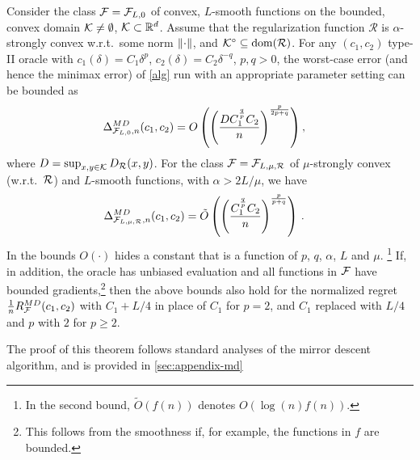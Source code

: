 \begin{theorem}
\label{thm:ub}
Consider the class $\mathcal{F}=\mathcal{F}_{L,0}$ of convex, $L$-smooth functions on the bounded, convex domain $\mathcal{K}\ne \emptyset$, $\mathcal{K} \subset \mathbb{R}^d$.
Assume that the regularization function $\mathcal{R}$ is $\alpha$-strongly convex w.r.t.\  some norm $\left\|\cdot\right\|$, and $\mathcal{K}^\circ\subseteq \operatorname{dom}(\mathcal{R})$.
For any $(c_1,c_2)$ type-II oracle 
with $c_1(\delta) = C_1 \delta^p$, $c_2(\delta) = C_2 \delta^{-q}$, $p,q>0$, 
the worst-case error (and hence the minimax error) of \cref{alg} run with an appropriate parameter setting
can be bounded as
 \begin{align}
 \label{eq:MDbound1}
 \Delta_{\mathcal{F}_{L,0},n}^{MD}(c_1,c_2) 
 &= O\left(\left(\dfrac{DC_1^{\frac{q}{p}}C_2}{n}\right)^{\frac{p}{2p+q}}\right),
 \end{align}
 where $D=\sup_{x,y\in \mathcal{K}} D_{\mathcal{R}}(x,y)$.
 For the class $\mathcal{F}=\mathcal{F}_{L,\mu,\mathcal{R}}$ of $\mu$-strongly convex (w.r.t.\  $\mathcal{R}$) and $L$-smooth functions, with $\alpha >2L/\mu$, 
we have
\begin{align}
\Delta_{\F_{L,\mu,\cR},n}^{MD}(c_1,c_2) 
& %
=  \tilde{O}\left( \left(\dfrac{C_1^{\frac{q}{p}} C_2}{n} \right)^{\frac{p}{p+q}} \right)\,.
\label{eq:MDbound2}
\end{align}
In the bounds $O(\cdot)$ hides a constant that is a function of $p$, $q$, $\alpha$, $L$ and $\mu$.%
\footnote{In the second bound, $\tilde{O}(f(n))$ denotes $O(\log(n) f(n))$.}
If, in addition, the oracle has unbiased evaluation and all functions in $\mathcal{F}$ have bounded gradients,\footnote{This follows from the smoothness if, for example, the functions in $f$  are bounded.} then the above bounds also hold for the normalized regret $\tfrac{1}{n} R_{\mathcal{F}}^{MD}(c_1,c_2)$ with $C_1+L/4$ in place of $C_1$ for $p=2$, and $C_1$ replaced with $L/4$ and $p$ with $2$ for $p \ge 2$.
\end{theorem}

The proof of this theorem follows standard analyses of the mirror descent algorithm, and is provided in \cref{sec:appendix-md}

